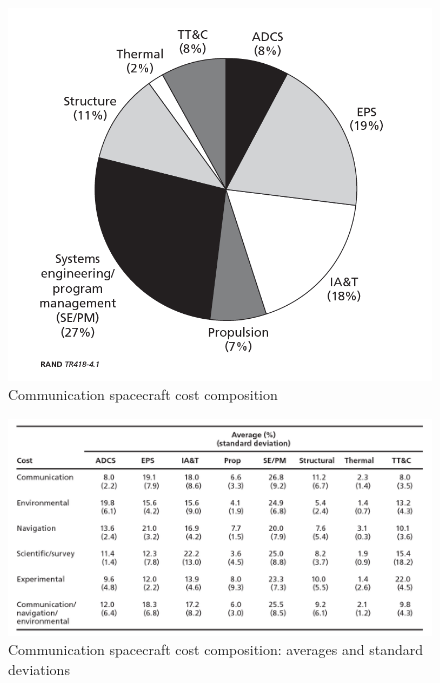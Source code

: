 \documentclass[11pt,a4paper,titlepage]{article}
\begin{document}
		\begin{figure}
			\centering
			\includegraphics[width = .7\textwidth]{Torta.png}
			\caption{Communication spacecraft cost composition}
			\label{fig:torta}
		\end{figure}
		
		\begin{figure}
			\centering
			\includegraphics[width = 1\textwidth]{Standard_dev.png}
			\caption{Communication spacecraft cost composition: averages and standard deviations}
			\label{fig:distribution}
		\end{figure}
		
\end{document}
